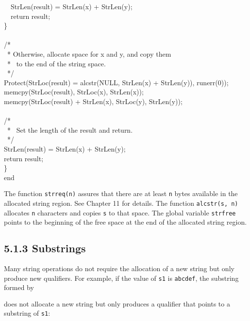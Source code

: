{\ \  StrLen(result) = StrLen(x) + StrLen(y);\\
\ \  return result;\\
\>\>\>\}\\
\\
\>\>/*\\
\>\>\ * Otherwise, allocate space for x and y, and copy them\\
\>\>\ * \ to the end of the string space.\\
\>\>\ */\\
\>\>Protect(StrLoc(result) = alcstr(NULL, StrLen(x) + StrLen(y)), runerr(0));\\
\>\>memcpy(StrLoc(result), StrLoc(x), StrLen(x));\\
\>\>memcpy(StrLoc(result) + StrLen(x), StrLoc(y), StrLen(y));\\
\\
\>\>/*\\
\>\>\ * \ Set the length of the result and return.\\
\>\>\ */\\
\>\>StrLen(result) = StrLen(x) + StrLen(y);\\
\>\>return result;\\
\>\>\}\\
end\\
}

The function \texttt{strreq(n)} assures that there are at least
\texttt{n} bytes available in the allocated string region. See Chapter
11 for details. The function \texttt{alcstr(s, n)} allocates
\texttt{n} characters and copies \texttt{s} to that space. The global
variable \texttt{strfree} points to the beginning of the free space at
the end of the allocated string region.

\subsection[5.1.3 Substrings]{5.1.3 Substrings}

Many string operations do not require the allocation of a new string
but only produce new qualifiers. For example, if the value of
\texttt{s1} is \texttt{{\textquotedbl}abcdef{\textquotedbl}}, the
substring formed by


\noindent does not allocate a new string but only produces a qualifier
that points to a substring of \texttt{s1}:



